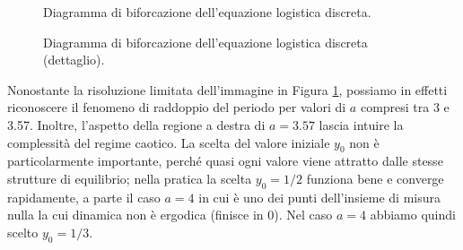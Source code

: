 \begin{figure}[tbp]
\centering
{}
\caption{Diagramma di biforcazione dell'equazione logistica discreta.}
\label{fig:diagramma-di-biforcazione}
\end{figure}

\begin{figure}[tbp]
\centering
{}
\caption{Diagramma di biforcazione dell'equazione logistica discreta (dettaglio).}
\label{fig:diagramma-di-biforcazione-dettaglio}
\end{figure}

Nonostante la risoluzione limitata dell'immagine in Figura
\ref{fig:diagramma-di-biforcazione}, possiamo in effetti riconoscere il fenomeno
di raddoppio del periodo per valori di $a$ compresi tra 3 e 3.57.
Inoltre, l'aspetto della regione a destra di $a = 3.57$ lascia intuire la
complessità del regime caotico. La scelta del valore iniziale $y_0$ non è
particolarmente importante, perché quasi ogni valore viene attratto dalle
stesse strutture di equilibrio;
nella pratica la scelta $y_0 = 1/2$ funziona bene e converge rapidamente,
a parte il caso $a = 4$ in cui è uno dei punti dell'insieme di misura nulla
la cui dinamica non è ergodica (finisce in 0). Nel caso $a = 4$ abbiamo quindi
scelto $y_0 = 1/3$.


















